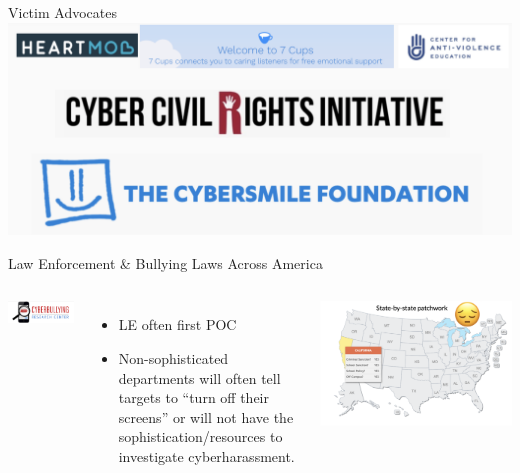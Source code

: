 \documentclass[nobackground,dvipsnames,table,aspectratio=169]{beamer}
\begin{document}
\begin{frame}{Victim Advocates}
    \includegraphics[width=\textwidth]{victim-advocates}
\end{frame}

\begin{frame}{Law Enforcement \& Bullying Laws Across America}
    \begin{columns}
            \includegraphics[width=\textwidth]{cyberbullying-research-center}
            \begin{itemize}
                \item LE often first POC
                \item Non-sophisticated departments will often tell targets to “turn off their screens” or will not have the sophistication/resources to investigate cyberharassment.
            \end{itemize}
            \includegraphics[width=\textwidth]{bullying-laws-map}
    \end{columns}
\end{frame}
\end{document}

